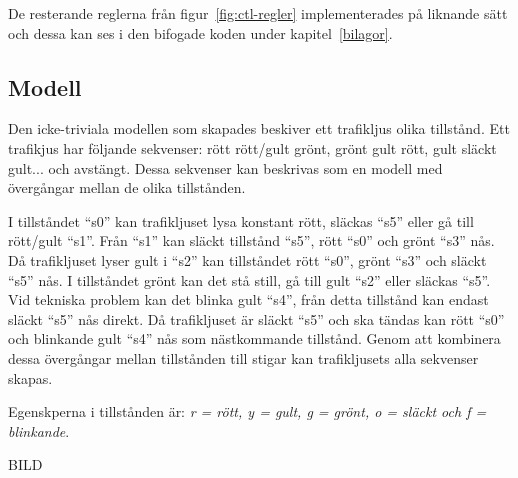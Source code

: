 De resterande reglerna från figur~\ref{fig:ctl-regler} implementerades på liknande sätt och dessa kan ses i den bifogade koden under kapitel~\ref{bilagor}.

\subsection{Modell}\label{sub:modell}

Den icke-triviala modellen som skapades beskiver ett trafikljus olika tillstånd. Ett trafikjus har följande sekvenser: rött \textrightarrow rött/gult \textrightarrow grönt, grönt \textrightarrow gult \textrightarrow rött, gult \textrightarrow släckt \textrightarrow gult... och avstängt. Dessa sekvenser kan beskrivas som en modell med övergångar mellan de olika tillstånden.

I tillståndet “s0” kan trafikljuset lysa konstant rött, släckas “s5” eller gå till rött/gult “s1”. Från “s1” kan släckt tillstånd “s5”, rött “s0” och grönt “s3” nås. Då trafikljuset lyser gult i “s2” kan tillståndet rött “s0”, grönt “s3” och släckt “s5” nås. I tillståndet grönt kan det stå still, gå till gult “s2” eller släckas “s5”. Vid tekniska problem kan det blinka gult “s4”, från detta tillstånd kan endast släckt “s5” nås direkt. Då trafikljuset är släckt “s5” och ska tändas kan rött “s0” och blinkande gult “s4” nås som nästkommande tillstånd. Genom att kombinera dessa övergångar mellan tillstånden till stigar kan trafikljusets alla sekvenser skapas.

Egenskperna i tillstånden är: \textit{r = rött, y = gult, g = grönt, o = släckt och f = blinkande}.

BILD
